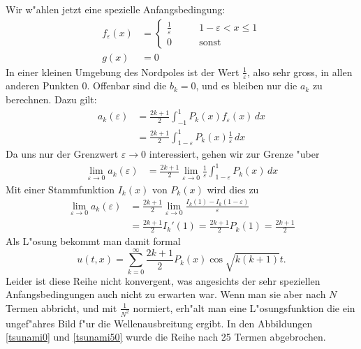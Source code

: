 Wir w"ahlen jetzt eine spezielle Anfangsbedingung:
\begin{align*}
f_\varepsilon(x)&=\begin{cases}
\frac1{\varepsilon}&\qquad 1-\varepsilon<x\le 1\\
0&\qquad\text{sonst}
\end{cases}
\\
g(x)&=0
\end{align*}
In einer kleinen Umgebung des Nordpoles ist der Wert 
$\frac1{\varepsilon}$, also sehr gross, in allen anderen Punkten $0$.
Offenbar sind die $b_k=0$, und es bleiben nur die 
$a_k$ zu berechnen. Dazu gilt:
\begin{align*}
a_k(\varepsilon)&=\frac{2k+1}{2}\int_{-1}^1P_k(x)f_\varepsilon(x)\,dx
\\
&=\frac{2k+1}{2}\int_{1-\varepsilon}^1P_k(x)\frac1{\varepsilon}\,dx
\end{align*}
Da uns nur der Grenzwert $\varepsilon\to 0$ interessiert, gehen wir
zur Grenze "uber
\begin{align*}
\lim_{\varepsilon\to 0} a_k(\varepsilon)
&=
\frac{2k+1}{2}\lim_{\varepsilon\to 0}\frac1{\varepsilon}\int_{1-\varepsilon}^1P_k(x)\,dx
\end{align*}
Mit einer Stammfunktion $I_k(x)$ von $P_k(x)$ wird dies zu
\begin{align*}
\lim_{\varepsilon\to 0} a_k(\varepsilon)
&=
\frac{2k+1}{2}\lim_{\varepsilon\to 0}\frac{I_k(1)-I_k(1-\varepsilon)}{\varepsilon}
\\
&=\frac{2k+1}{2}I_k'(1)=\frac{2k+1}{2}P_k(1)=\frac{2k+1}{2}
\end{align*}
Als L"osung bekommt man damit formal
\begin{equation}
u(t,x)
=
\sum_{k=0}^\infty \frac{2k+1}{2}P_k(x) \cos \sqrt{k(k+1)}t.
\end{equation}
Leider ist diese Reihe nicht konvergent, was angesichts der sehr
speziellen Anfangsbedingungen auch nicht zu erwarten war.
Wenn man sie aber nach $N$ Termen abbricht, und mit $\frac1{N^2}$ 
normiert, erh"alt man eine L"osungsfunktion die ein ungef"ahres
Bild f"ur die Wellenausbreitung ergibt.
In den Abbildungen \ref{tsunami0} und \ref{tsunami50} wurde die Reihe nach 25 Termen
abgebrochen.
